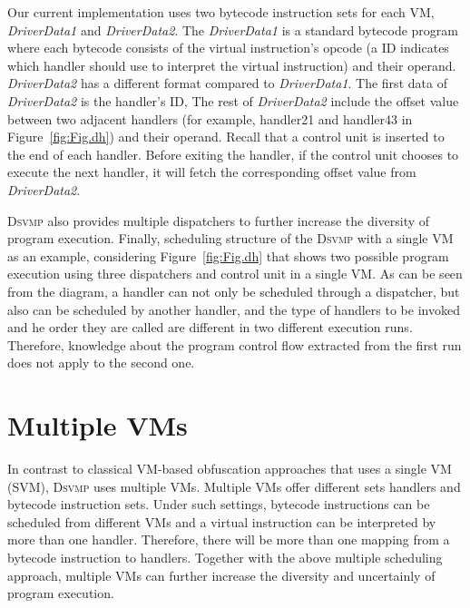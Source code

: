\documentclass[preprint,12pt,3p]{elsarticle}
\newcommand{\DSVMP}{\textsc{Dsvmp}\xspace}
\begin{document}
Our current implementation uses two bytecode instruction sets for each VM,
\emph{DriverData1} and \emph{DriverData2}. The \emph{DriverData1} is a
standard bytecode program where each bytecode consists of the
virtual instruction's opcode (a ID indicates which handler should use to
interpret the virtual instruction) and their operand. \emph{DriverData2} has a different
format compared to \emph{DriverData1}. The first data of \emph{DriverData2}
is the handler's ID, The rest of \emph{DriverData2} include the
offset value between two adjacent handlers (for example, handler21 and handler43 in Figure~\ref{fig:Fig.dh}) and their operand.
Recall that a control unit is inserted to the end of each handler. Before exiting the handler,
if the control unit chooses to execute the next handler, it will fetch the corresponding offset value from \emph{DriverData2}.

\DSVMP also provides multiple dispatchers to further increase the diversity of program execution.
Finally, scheduling structure of the \DSVMP with a single VM as an example, considering Figure~\ref{fig:Fig.dh} that
shows two possible program execution using three dispatchers and control unit in a single VM. As can be seen
from the diagram, a handler can not only be scheduled through a dispatcher, but also can be scheduled by another handler,
and the type of handlers to be invoked and he order they are called are different in two different execution runs.
Therefore, knowledge about the program control flow extracted from the first run does not apply to the second one.


\section{Multiple VMs}\label{sec:mvm}
In contrast to classical VM-based obfuscation approaches that uses a single VM (SVM), \DSVMP uses multiple VMs.
Multiple VMs offer different sets handlers and bytecode instruction sets. Under such settings,
bytecode instructions can be scheduled from different VMs and a virtual instruction can be interpreted by more than one handler.
Therefore, there will be more than one mapping from a bytecode instruction to handlers.
Together with the above multiple scheduling approach, multiple VMs can further increase the diversity and uncertainly of program execution.
\end{document}
